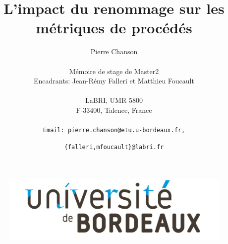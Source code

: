 \documentclass[12pt,a4paper]{article}
\title{\vspace{4cm}\textbf{L'impact du renommage sur les métriques de procédés}\vspace{3cm}}
\author{
Pierre Chanson\\\\
Mémoire de stage de Master2\\
Encadrants: Jean-Rémy Falleri et Matthieu Foucault\\\\
LaBRI, UMR 5800\\
F-33400, Talence, France\\\\
\texttt{Email: pierre.chanson@etu.u-bordeaux.fr,}\and
\texttt{\{falleri,mfoucault\}@labri.fr}\\
}
\begin{document}
\begin{figure}[t]
\center
\includegraphics[scale=0.25]{data/figures/UnivBordeaux.jpg}
\end{figure}
\maketitle
\newpage
\tableofcontents
\newpage






\newpage


%
\end{document}
